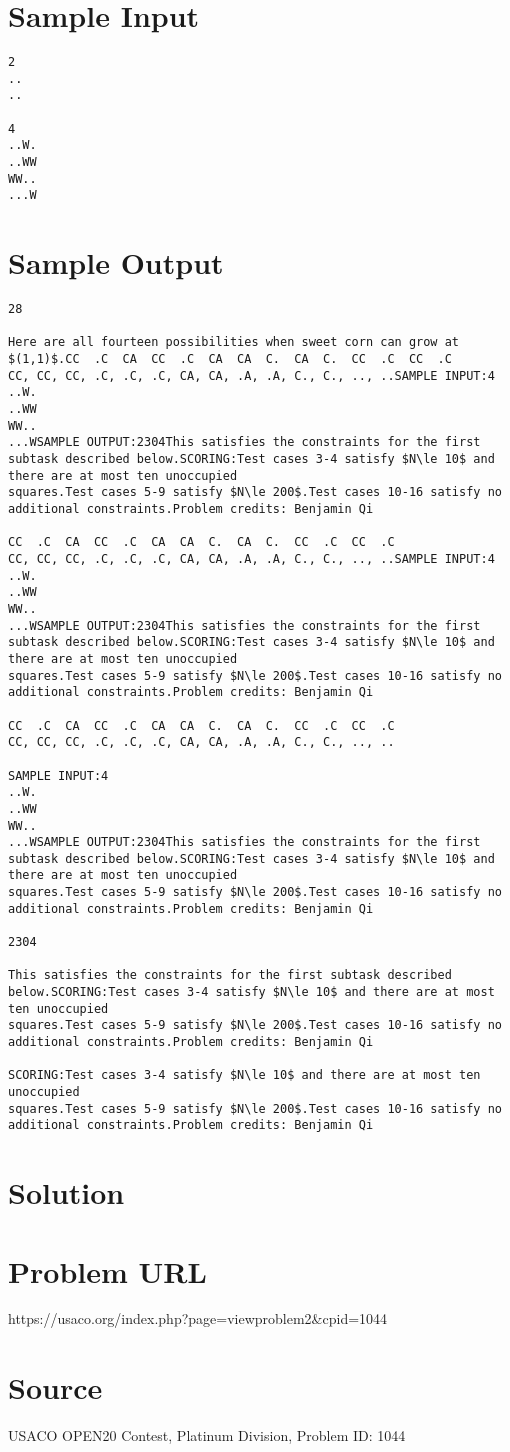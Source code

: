 \documentclass[12pt]{article}
\begin{document}
\section*{Sample Input}
\begin{verbatim}
2
..
..

4
..W.
..WW
WW..
...W
\end{verbatim}

\section*{Sample Output}
\begin{verbatim}
28

Here are all fourteen possibilities when sweet corn can grow at $(1,1)$.CC  .C  CA  CC  .C  CA  CA  C.  CA  C.  CC  .C  CC  .C  
CC, CC, CC, .C, .C, .C, CA, CA, .A, .A, C., C., .., ..SAMPLE INPUT:4
..W.
..WW
WW..
...WSAMPLE OUTPUT:2304This satisfies the constraints for the first subtask described below.SCORING:Test cases 3-4 satisfy $N\le 10$ and there are at most ten unoccupied
squares.Test cases 5-9 satisfy $N\le 200$.Test cases 10-16 satisfy no additional constraints.Problem credits: Benjamin Qi

CC  .C  CA  CC  .C  CA  CA  C.  CA  C.  CC  .C  CC  .C  
CC, CC, CC, .C, .C, .C, CA, CA, .A, .A, C., C., .., ..SAMPLE INPUT:4
..W.
..WW
WW..
...WSAMPLE OUTPUT:2304This satisfies the constraints for the first subtask described below.SCORING:Test cases 3-4 satisfy $N\le 10$ and there are at most ten unoccupied
squares.Test cases 5-9 satisfy $N\le 200$.Test cases 10-16 satisfy no additional constraints.Problem credits: Benjamin Qi

CC  .C  CA  CC  .C  CA  CA  C.  CA  C.  CC  .C  CC  .C  
CC, CC, CC, .C, .C, .C, CA, CA, .A, .A, C., C., .., ..

SAMPLE INPUT:4
..W.
..WW
WW..
...WSAMPLE OUTPUT:2304This satisfies the constraints for the first subtask described below.SCORING:Test cases 3-4 satisfy $N\le 10$ and there are at most ten unoccupied
squares.Test cases 5-9 satisfy $N\le 200$.Test cases 10-16 satisfy no additional constraints.Problem credits: Benjamin Qi

2304

This satisfies the constraints for the first subtask described below.SCORING:Test cases 3-4 satisfy $N\le 10$ and there are at most ten unoccupied
squares.Test cases 5-9 satisfy $N\le 200$.Test cases 10-16 satisfy no additional constraints.Problem credits: Benjamin Qi

SCORING:Test cases 3-4 satisfy $N\le 10$ and there are at most ten unoccupied
squares.Test cases 5-9 satisfy $N\le 200$.Test cases 10-16 satisfy no additional constraints.Problem credits: Benjamin Qi
\end{verbatim}

\section*{Solution}


\section*{Problem URL}
https://usaco.org/index.php?page=viewproblem2&cpid=1044

\section*{Source}
USACO OPEN20 Contest, Platinum Division, Problem ID: 1044
\end{document}
